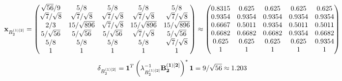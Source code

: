 \documentclass[10pt,a4paper]{article}
\begin{document}
	\[
		\bold{x}_{B_2^{(1)[2]}} = 
		\begin{pmatrix}
			{\sqrt{56}} / {{9}} & {{5}} / {{8}} & {{5}} / {{8}} & {{5}} / {{8}} & {{5}} / {{8}} \\
			{\sqrt{7}} / {\sqrt{8}} & {\sqrt{7}} / {\sqrt{8}} & {\sqrt{7}} / {\sqrt{8}} & {\sqrt{7}} / {\sqrt{8}} & {\sqrt{7}} / {\sqrt{8}} \\
			{{2}} / {{3}} & {{15}} / {\sqrt{896}} & {\sqrt{7}} / {\sqrt{8}} & {{15}} / {\sqrt{896}} & {{15}} / {\sqrt{896}} \\
			{{5}} / {\sqrt{56}} & {{5}} / {\sqrt{56}} & {{5}} / {\sqrt{56}} & {\sqrt{7}} / {\sqrt{8}} & {{5}} / {\sqrt{56}} \\
			{{5}} / {{8}} & {{5}} / {{8}} & {{5}} / {{8}} & {{5}} / {{8}} & {\sqrt{7}} / {\sqrt{8}} \\
			{1}{} & {1}{} & {1}{} & {1}{} & {1}{} \\
		\end{pmatrix}
		\approx
		\begin{pmatrix}
			0.8315   & 0.625    & 0.625    & 0.625    & 0.625    \\
			0.9354   & 0.9354   & 0.9354   & 0.9354   & 0.9354   \\
			0.6667   & 0.5011   & 0.9354   & 0.5011   & 0.5011   \\
			0.6682   & 0.6682   & 0.6682   & 0.9354   & 0.6682   \\
			0.625    & 0.625    & 0.625    & 0.625    & 0.9354   \\
			1        & 1        & 1        & 1        & 1        \\
		\end{pmatrix}
	\]
	\[
		\delta_{B_2^{(1)[2]}} = \bold{1}^T \left(\lambda_{B_2^{(1)[2]}}^{-1}\bold{B_2^{(1)[2]}}\right)^* \bold{1} = {{9}} / {\sqrt{56}}\approx 1.203
	\]
\end{document}
